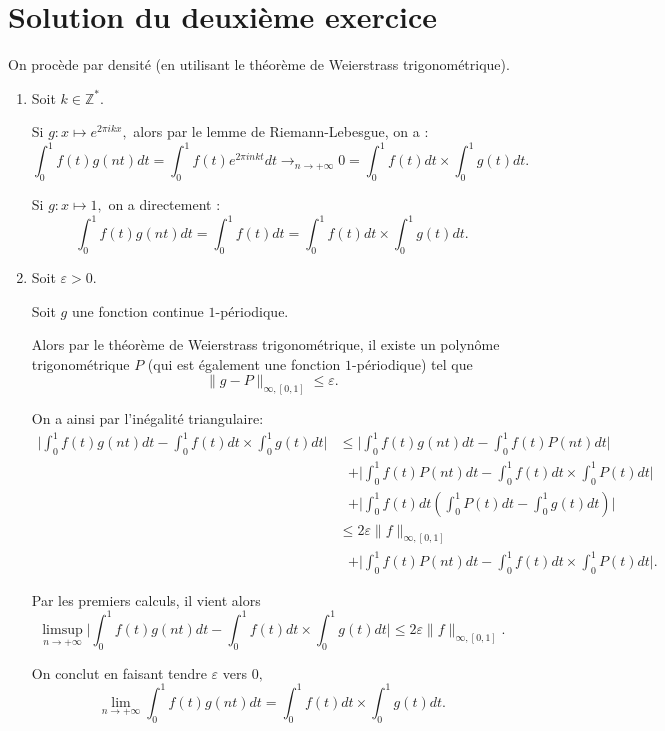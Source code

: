 \section{Solution du deuxième exercice}

On procède par densité (en utilisant le théorème de Weierstrass trigonométrique).

\begin{enumerate}
\item Soit $k\in \mathbb{Z}^{*}.$

Si $\displaystyle g :x \mapsto e^{2\pi ikx},$ alors par le lemme de Riemann-Lebesgue, on a : $$\int_{0}^{1}f(t)g(nt)dt=\int_{0}^{1}f(t)e^{2\pi inkt}dt\longrightarrow_{n\rightarrow +\infty} 0=\int_{0}^{1}f(t)dt\times \int_{0}^{1}g(t)dt.$$

Si $\displaystyle g :x \mapsto 1,$ on a directement : $$\int_{0}^{1}f(t)g(nt)dt=\int_{0}^{1}f(t)dt=\int_{0}^{1}f(t)dt\times \int_{0}^{1}g(t)dt.$$

\item Soit $\varepsilon>0.$

Soit $g$ une fonction continue $1$-périodique. 

Alors par le théorème de Weierstrass trigonométrique, il existe un polynôme trigonométrique $P$ (qui est également une fonction $1$-périodique) tel que $$\|g-P\|_{{\infty},[0,1]}\leq \varepsilon.$$

On a ainsi par l'inégalité triangulaire: 
\begin{align*}
\vert \int_{0}^{1}f(t)g(nt)dt-\int_{0}^{1}f(t)dt\times \int_{0}^{1}g(t)dt \vert & \leq \vert \int_{0}^{1}f(t)g(nt)dt-\int_{0}^{1}f(t)P(nt)dt\vert\\
& \mbox{ }+ \vert \int_{0}^{1}f(t)P(nt)dt-\int_{0}^{1}f(t)dt\times \int_{0}^{1}P(t)dt \vert\\
& \mbox{ }+ \vert \int_{0}^{1}f(t)dt\left(\int_{0}^{1}P(t)dt-\int_{0}^{1}g(t)dt\right)\vert\\
& \leq 2\varepsilon\|f\|_{{\infty},[0,1]}\\
& \mbox{ }+ \vert \int_{0}^{1}f(t)P(nt)dt-\int_{0}^{1}f(t)dt\times \int_{0}^{1}P(t)dt \vert.
\end{align*}

Par les premiers calculs, il vient alors $$\limsup_{n\rightarrow +\infty}\vert \int_{0}^{1}f(t)g(nt)dt-\int_{0}^{1}f(t)dt\times \int_{0}^{1}g(t)dt \vert \leq 2\varepsilon\|f\|_{{\infty},[0,1]}.$$

On conclut en faisant tendre $\varepsilon$ vers $0,$ $$\lim_{n\rightarrow +\infty}\int_{0}^{1}f(t)g(nt)dt=\int_{0}^{1}f(t)dt\times \int_{0}^{1}g(t)dt.$$ 

\end{enumerate}

